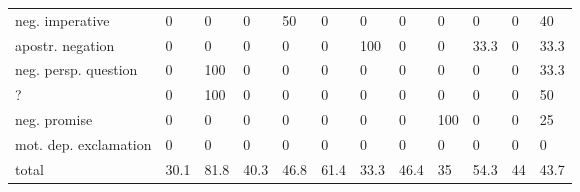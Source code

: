 \begin{screenonly}
\begin{table*}[h]
\begin{tabular*}{\hsize}{@{\extracolsep{\fill}}llllllllllll}
    neg. imperative & 0 & 0 & 0 & 50 & 0 & 0 & 0 & 0 & 0 & 0 & 40\\
    apostr. negation & 0 & 0 & 0 & 0 & 0 & 100 & 0 & 0 & 33.3 & 0 & 33.3\\
    neg. persp. question & 0 & 100 & 0 & 0 & 0 & 0 & 0 & 0 & 0 & 0 & 33.3\\
    ? & 0 & 100 & 0 & 0 & 0 & 0 & 0 & 0 & 0 & 0 & 50\\
    neg. promise & 0 & 0 & 0 & 0 & 0 & 0 & 0 & 100 & 0 & 0 & 25\\
    mot. dep. exclamation & 0 & 0 & 0 & 0 & 0 & 0 & 0 & 0 & 0 & 0 & 0\\
    \midrule
    total & 30.1 & 81.8 & 40.3 & 46.8 & 61.4 & 33.3 & 46.4 & 35 & 54.3 & 44 & 43.7\\
    \bottomrule
  \end{tabular*}
\end{table*}


\end{screenonly}
